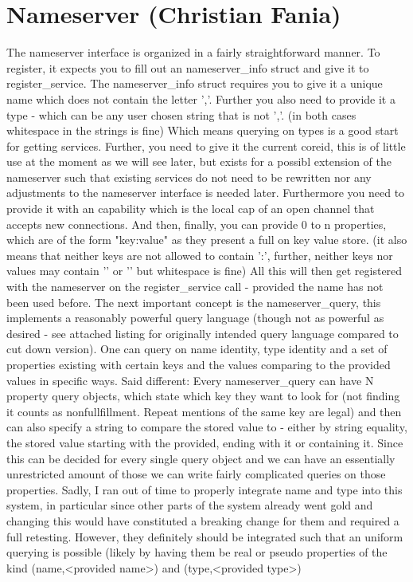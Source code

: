 \section{Nameserver (Christian Fania)}\label{s:nameserver}
The nameserver interface is organized in a fairly straightforward manner.
To register, it expects you to fill out an nameserver\_info struct and give it to register\_service.
The nameserver\_info struct requires you to give it a unique name which does not contain the letter ','. Further you also need to provide it a type - which can be any user chosen string that is not ','. (in both cases whitespace in the strings is fine) Which means querying on types is a good start for getting services.
Further, you need to give it the current coreid, this is of little use at the moment as we will see later, but exists for a possibl extension of the nameserver such that existing services do not need to be rewritten nor any adjustments to the nameserver interface is needed later.
Furthermore you need to provide it with an capability which is the local cap of an open channel that accepts new connections.
And then, finally, you can provide 0 to n properties, which are of the form "key:value" as they present a full on key value store. (it also means that neither keys are not allowed to contain ':', further, neither keys nor values may contain '{' or '}' but whitespace is fine)
All this will then get registered with the nameserver on the register\_service call - provided the name has not been used before.
The next important concept is the nameserver\_query, this implements a reasonably powerful query language (though not as powerful as desired - see attached listing for originally intended query language compared to cut down version). One can query on name identity, type identity and a set of properties existing with certain keys and the values comparing to the provided values in specific ways.
Said different: Every nameserver\_query can have N property query objects, which state which key they want to look for (not finding it counts as nonfullfillment. Repeat mentions of the same key are legal) and then can also specify a string to compare the stored value to - either by string equality, the stored value starting with the provided, ending with it or containing it.
Since this can be decided for every single query object and we can have an essentially unrestricted amount of those we can write fairly complicated queries on those properties.
Sadly, I ran out of time to properly integrate name and type into this system, in particular since other parts of the system already went gold and changing this would have constituted a breaking change for them and required a full retesting. However, they definitely should be integrated such that an uniform querying is possible (likely by having them be real or pseudo properties of the kind (name,<provided name>) and (type,<provided type>)
